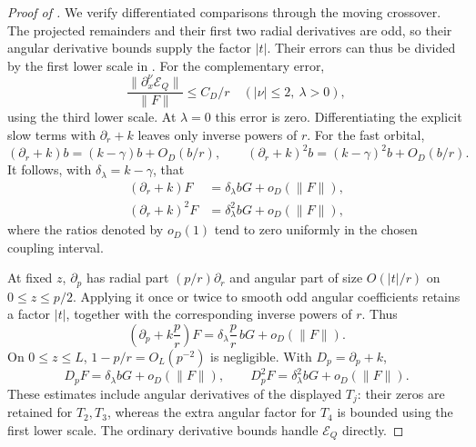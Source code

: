 \begin{proof}[Proof of ]
We verify differentiated comparisons through the moving crossover.
The projected remainders and their first two radial derivatives
are odd, so their angular derivative bounds supply the factor
\(|t|\).  Their errors can thus be divided by the first lower
scale in .
For the complementary error,
\[
 \frac{\|\partial_x^\nu\mathcal E_Q\|}{\|F\|}
 \leq C_D/r\quad(|\nu|\leq2,\ \lambda>0),
 \]
using the third lower scale.  At \(\lambda=0\) this error is zero.
Differentiating the explicit slow terms with \(\partial_r+k\)
leaves only inverse powers of \(r\).
For the fast orbital,
\[
 (\partial_r+k)b=(k-\gamma)b+O_D(b/r),\qquad
 (\partial_r+k)^2b=(k-\gamma)^2b+O_D(b/r).
 \]
It follows, with \(\delta_\lambda=k-\gamma\), that
\begin{equation}
 \begin{split}
 (\partial_r+k)F&=\delta_\lambda bG+o_D(\|F\|),\\
 (\partial_r+k)^2F&=\delta_\lambda^2bG+o_D(\|F\|),
 \end{split}
 \label{eq:radial-relative-derivatives}
\end{equation}
where the ratios denoted by \(o_D(1)\) tend to zero uniformly
in the chosen coupling interval.

At fixed \(z\), \(\partial_p\) has radial part
\((p/r)\partial_r\) and angular part of size \(O(|t|/r)\)
on \(0\leq z\leq p/2\).
Applying it once or twice to smooth odd angular coefficients
retains a factor \(|t|\), together with the corresponding
inverse powers of \(r\).  Thus
\[
 \left(\partial_p+k\frac p r\right)F
 =\delta_\lambda\frac p r\,bG+o_D(\|F\|).
 \]
On \(0\leq z\leq L\), \(1-p/r=O_L(p^{-2})\) is negligible.
With \(D_p=\partial_p+k\),
\begin{equation}
 D_pF=\delta_\lambda bG+o_D(\|F\|),\qquad
 D_p^2F=\delta_\lambda^2bG+o_D(\|F\|).
 \label{eq:horizontal-relative-derivatives}
\end{equation}
These estimates include angular derivatives of the displayed
\(T_j\): their zeros are retained for \(T_2,T_3\), whereas the
extra angular factor for \(T_4\) is bounded using the first lower
scale.  The ordinary derivative bounds handle \(\mathcal E_Q\)
directly.


\end{proof}
